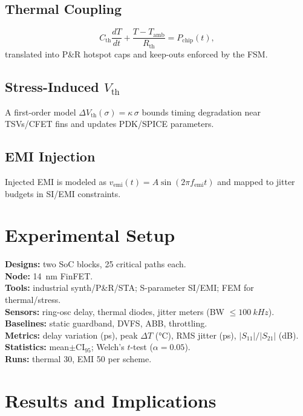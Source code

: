 \documentclass[conference]{IEEEtran}
\newcommand{\CI}{\mathrm{CI}_{95}}
\begin{document}
\subsection{Thermal Coupling}
\begin{equation}
C_{\mathrm{th}}\frac{dT}{dt}+\frac{T-T_{\mathrm{amb}}}{R_{\mathrm{th}}}=P_{\mathrm{chip}}(t),
\label{eq:thermal}
\end{equation}
translated into P\&R hotspot caps and keep-outs enforced by the FSM.

\subsection{Stress-Induced $V_\mathrm{th}$}
A first-order model $\Delta V_{\mathrm{th}}(\sigma)=\kappa\,\sigma$ bounds timing degradation near TSVs/CFET fins and updates PDK/SPICE parameters.

\subsection{EMI Injection}
Injected EMI is modeled as $v_{\mathrm{emi}}(t)=A\sin (2\pi f_{\mathrm{emi}} t)$ and mapped to jitter budgets in SI/EMI constraints.

\section{Experimental Setup}
\textbf{Designs:} two SoC blocks, 25 critical paths each.\\
\textbf{Node:} \SI{14}{\nano\meter} FinFET.\\
\textbf{Tools:} industrial synth/P\&R/STA; S-parameter SI/EMI; FEM for thermal/stress.\\
\textbf{Sensors:} ring-osc delay, thermal diodes, jitter meters (BW $\leq\SI{100}{kHz}$).\\
\textbf{Baselines:} static guardband, DVFS, ABB, throttling.\\
\textbf{Metrics:} delay variation (ps), peak $\Delta T$ (\si{\celsius}), RMS jitter (ps), $|S_{11}|/|S_{21}|$ (dB).\\
\textbf{Statistics:} mean$\pm\CI$; Welch's $t$-test ($\alpha=0.05$).\\
\textbf{Runs:} thermal 30, EMI 50 per scheme.

\section{Results and Implications}
\end{document}
